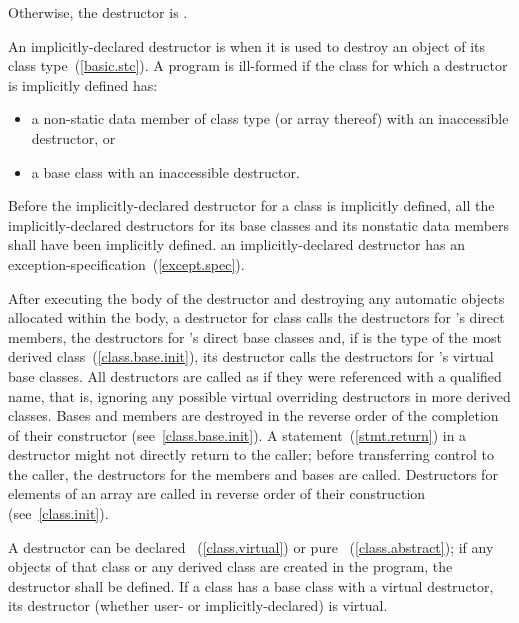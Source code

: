 \pnum
Otherwise, the destructor is
.

\pnum
{}%
An implicitly-declared destructor is  when it is
used to destroy an object of its class type~(\ref{basic.stc}). A program is
ill-formed if the class for which a destructor is implicitly defined has:

\begin{itemize}
\item a non-static data member of class type (or array thereof) with an
inaccessible destructor, or
\item a base class with an inaccessible destructor.
\end{itemize}

Before the implicitly-declared
destructor for a class is implicitly defined, all the implicitly-declared
destructors for its base classes and its nonstatic data members shall have been
implicitly defined.
\enternote
an implicitly-declared destructor has an
exception-specification~(\ref{except.spec}).
\exitnote

\pnum
{}%
%
%
After executing the body of the destructor and destroying
any automatic objects allocated within the body, a
destructor for class
calls the destructors for
's
direct members, the destructors for
's
direct base classes and, if
is the type of the most derived class~(\ref{class.base.init}),
its destructor calls the destructors for
's
virtual base classes.
All destructors are called as if they were referenced with a qualified name,
that is, ignoring any possible virtual overriding destructors in more
derived classes.
Bases and members are destroyed in the reverse order of the completion of
their constructor (see~\ref{class.base.init}).
A
statement~(\ref{stmt.return}) in a destructor might not directly return to the
caller; before transferring control to the caller, the destructors for the
members and bases are called.
%
Destructors for elements of an array are called in reverse order of their
construction (see~\ref{class.init}).

\pnum
{}%
%
A destructor can be declared
~(\ref{class.virtual})
or pure
~(\ref{class.abstract});
if any objects of that class or any derived class are created in the program,
the destructor shall be defined.
If a class has a base class with a virtual destructor, its  destructor
(whether user- or implicitly-declared) is virtual.

